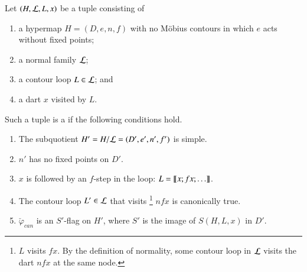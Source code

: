 \begin{definition}\label{def:marked}
Let $(H,{\cal L},L,x)$ be a tuple consisting of 
\begin{enumerate}
\item a hypermap $H=(D,e,n,f)$ with no M\"obius contours  in which
  $e$ acts without fixed points;  %
\item a normal family ${\cal L}$; 
\item a contour loop $L\in{\cal L}$; and
\item a dart $x$ visited by $L$.
\end{enumerate}
Such a tuple is a  if
the following conditions hold.
\begin{enumerate}
\item The subquotient $H'=H/{\cal L} = (D',e',n',f')$ is simple.  
\item $n'$ has no fixed points on $D'$.
\item $x$ is followed by an $f$-step in the loop: $L = {\llbracket{x;fx;\ldots}\rrbracket}$.
\item The contour loop $L'\in {\cal L}$ that visits%
\footnote{$L$ visits  $f x$.  By the definition of normality, some contour loop in
${\cal L}$ visits the dart $n f x$ at the same node.} 
$n f x$ is canonically true.
\item 
  $\check\varphi_{can}$ is an $S'$-flag on $H'$, where $S'$ is the image of 
  $S(H,L,x)$ in $D'$.  %
\end{enumerate}
\end{definition}


